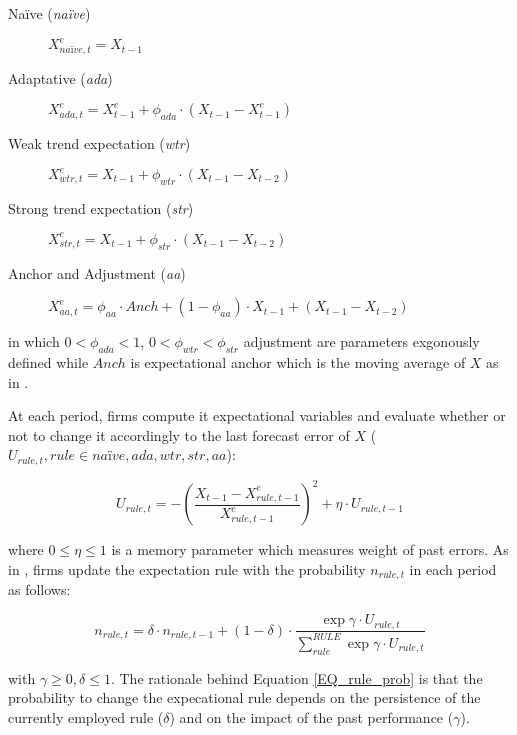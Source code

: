 \documentclass{SelfArx}
\begin{document}
\begin{description}
\item[{Naïve (\emph{naïve})}] \(X^{e}_{na\text{\"{i}}ve,t} = X_{t-1}\)
\item[{Adaptative (\emph{ada})}] \(X^{e}_{ada,t} = X^{e}_{t-1} + \phi_{ada}\cdot (X_{t-1} - X^{e}_{t-1})\)
\item[{Weak trend expectation (\emph{wtr})}] \(X^{e}_{wtr,t} = X_{t-1} + \phi_{wtr}\cdot (X_{t-1} - X_{t-2})\)
\item[{Strong trend expectation (\emph{str})}] \(X^{e}_{str,t} = X_{t-1} + \phi_{str}\cdot (X_{t-1} - X_{t-2})\)
\item[{Anchor and Adjustment (\emph{aa})}] \(X^{e}_{aa,t} = \phi_{aa}\cdot Anch + (1-\phi_{aa})\cdot X_{t-1} + (X_{t-1} - X_{t-2})\)
\end{description}

in which \(0 < \phi_{ada} < 1\), \(0 < \phi_{wtr} < \phi_{str}\) adjustment are parameters exgonously defined while \(Anch\) is expectational anchor which is the moving average of \(X\) as in \textcite{reissl_2021_Heterogeneousa}.

At each period, firms compute it expectational variables and evaluate whether or not to change it accordingly to the last forecast error of \(X\) (\(U_{rule,t}, rule \in {na\text{\"i}ve}, ada, wtr, str, aa\)):
\begin{latex}
\begin{equation}
\label{Ch_super_EQ_LFE}
U_{rule,t} = - \left(\frac{X_{t-1} - X^{e}_{rule,t-1}}{X^{e}_{rule,t-1}}\right)^{2} + \eta\cdot U_{rule,t-1}
\end{equation}
\end{latex}
where \(0 \leq \eta \leq 1\) is a memory parameter which measures weight of past errors.
As in \textcite{dosi_2020_RATIONAL}, firms update the expectation rule with the probability \(n_{rule,t}\) in each period as follows:
\begin{latex}
\begin{equation}
\label{Ch_super_EQ_rule_prob}
n_{rule,t} = \delta\cdot n_{rule,t-1} + (1-\delta)\cdot \frac{\exp{\gamma\cdot U_{rule,t}}}{\sum_{rule}^{RULE}\exp{\gamma\cdot U_{rule,t}}}
\end{equation}
\end{latex}
with \(\gamma \geq 0, \delta \leq 1\).
The rationale behind Equation \ref{EQ_rule_prob} is that the probability to change the expecational rule depends on the persistence of the currently employed rule (\(\delta\)) and on the impact of the past performance (\(\gamma\)).
\end{document}
